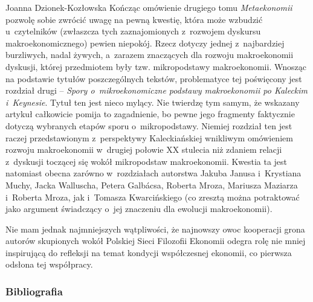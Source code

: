 \begin{recplenv}{Joanna Dzionek-Kozłowska}
Kończąc omówienie drugiego tomu \textit{Metaekonomii} pozwolę sobie zwrócić uwagę na pewną kwestię, która może wzbudzić
u~czytelników (zwłaszcza tych zaznajomionych z~rozwojem dyskursu makroekonomicznego) pewien niepokój. Rzecz dotyczy
jednej z~najbardziej burzliwych, nadal żywych, a~zarazem znaczących dla rozwoju makroekonomii dyskusji, której
przedmiotem były tzw. mikropodstawy makroekonomii. Wnosząc na podstawie tytułów poszczególnych tekstów, problematyce
tej poświęcony jest rozdział drugi -- \textit{Spory o~mikroekonomiczne podstawy makroekonomii po Kaleckim i~Keynesie}.
Tytuł ten jest nieco mylący. Nie twierdzę tym samym, że wskazany artykuł całkowicie pomija to
zagadnienie, bo pewne jego fragmenty faktycznie dotyczą wybranych etapów sporu o~mikropodstawy. Niemiej rozdział ten
jest raczej przedstawionym z~perspektywy Kaleckiańskiej wnikliwym omówieniem rozwoju makroekonomii w~drugiej połowie XX
stulecia niż zdaniem relacji z~dyskusji toczącej się wokół mikropodstaw makroekonomii. Kwestia ta jest natomiast obecna
zarówno w~rozdziałach autorstwa Jakuba Janusa i~Krystiana Muchy, Jacka Walluscha, Petera\textit{ }Galbácsa, Roberta
Mroza, Mariusza Maziarza i~Roberta Mroza, jak i~Tomasza Kwarcińskiego (co zresztą można potraktować jako argument
świadczący o~jej znaczeniu dla ewolucji makroekonomii).

Nie mam jednak najmniejszych wątpliwości, że najnowszy owoc kooperacji grona autorów skupionych wokół Polskiej Sieci
Filozofii Ekonomii odegra rolę nie mniej inspirującą do refleksji na temat kondycji współczesnej ekonomii, co pierwsza
odsłona tej współpracy. 









\subsubsection{Bibliografia}\nopagebreak[4]
\end{recplenv}
